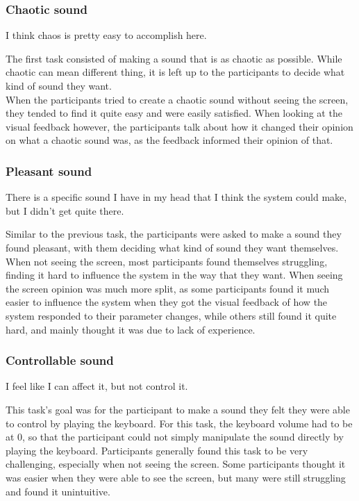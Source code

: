 \documentclass[a4paper,english]{report}
\begin{document}
	\subsubsection{Chaotic sound}
	\begin{displayquote}
		I think chaos is pretty easy to accomplish here.
	\end{displayquote}
	The first task consisted of making a sound that is as chaotic as possible. While chaotic can mean different thing, it is left up to the participants to decide what kind of sound they want.\\
	When the participants tried to create a chaotic sound without seeing the screen, they tended to find it quite easy and were easily satisfied. When looking at the visual feedback however, the participants talk about how it changed their opinion on what a chaotic sound was, as the feedback informed their opinion of that.
	\subsubsection{Pleasant sound}
	\begin{displayquote}
		There is a specific sound I have in my head that I think the system could make, but I didn't get quite there.
	\end{displayquote}
	Similar to the previous task, the participants were asked to make a sound they found pleasant, with them deciding what kind of sound they want themselves. When not seeing the screen, most participants found themselves struggling, finding it hard to influence the system in the way that they want. When seeing the screen opinion was much more split, as some participants found it much easier to influence the system when they got the visual feedback of how the system responded to their parameter changes, while others still found it quite hard, and mainly thought it was due to lack of experience.
	\subsubsection{Controllable sound}
	\begin{displayquote}
		I feel like I can affect it, but not control it.
	\end{displayquote}
	This task's goal was for the participant to make a sound they felt they were able to control by playing the keyboard. For this task, the keyboard volume had to be at 0, so that the participant could not simply manipulate the sound directly by playing the keyboard. Participants generally found this task to be very challenging, especially when not seeing the screen. Some participants thought it was easier when they were able to see the screen, but many were still struggling and found it unintuitive.
\end{document}
